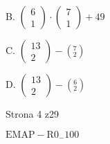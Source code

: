 \documentclass[a4paper,12pt]{article}
\begin{document}
B. $\left(\begin{array}{l}
6\\
1
\end{array}\right)\cdot\left(\begin{array}{l}
7\\
1
\end{array}\right)+49$

C. $\left(\begin{array}{l}
13\\
2
\end{array}\right)-(_{2}^{7})$

D. $\left(\begin{array}{l}
13\\
2
\end{array}\right)-(_{2}^{6})$

Strona 4 z29

$\mathrm{E}\mathrm{M}\mathrm{A}\mathrm{P}-\mathrm{R}0_{-}100$
\end{document}
